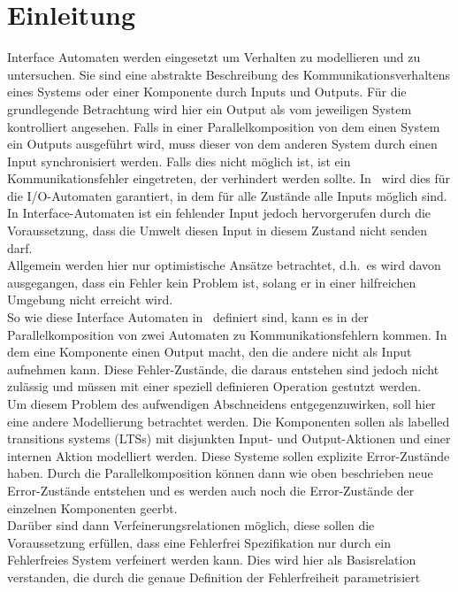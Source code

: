 \chapter{Einleitung}

Interface Automaten werden eingesetzt um Verhalten zu modellieren und zu
untersuchen. Sie sind eine abstrakte Beschreibung des Kommunikationsverhaltens
eines Systems oder einer Komponente durch Inputs und Outputs. Für die
grundlegende Betrachtung wird hier ein Output als vom jeweiligen System
kontrolliert angesehen. Falls in einer Parallelkomposition von dem einen System
ein Outputs ausgeführt wird, muss dieser von dem anderen System durch einen
Input synchronisiert werden. Falls dies nicht möglich ist, ist ein
Kommunikationsfehler eingetreten, der verhindert werden sollte.
In~\cite{Lynch1996} wird dies für die I/O-Automaten garantiert, in dem für alle
Zustände alle Inputs möglich sind. In Interface-Automaten ist ein fehlender
Input jedoch hervorgerufen durch die Voraussetzung, dass die Umwelt diesen
Input in diesem Zustand nicht senden darf.\\
Allgemein werden hier nur optimistische Ansätze betrachtet, d.h.\ es wird davon
ausgegangen, dass ein Fehler kein Problem ist, solang er in einer hilfreichen
Umgebung nicht erreicht wird.\\
So wie diese Interface Automaten in~\cite{Alfaro2004} definiert sind, kann es
in der Parallelkomposition von zwei Automaten zu Kommunikationsfehlern kommen.
In dem eine Komponente einen Output macht, den die andere nicht als Input
aufnehmen kann. Diese Fehler-Zustände, die daraus entstehen sind jedoch nicht
zulässig und müssen mit einer speziell definieren Operation gestutzt werden.\\
Um diesem Problem des aufwendigen Abschneidens entgegenzuwirken, soll hier eine
andere Modellierung betrachtet werden. Die Komponenten sollen als labelled
transitions systems (LTSs) mit disjunkten Input- und Output-Aktionen und einer
internen Aktion modelliert werden. Diese Systeme sollen explizite
Error-Zustände haben. Durch die Parallelkomposition können dann wie oben
beschrieben neue Error-Zustände entstehen und es werden auch noch die
Error-Zustände der einzelnen Komponenten geerbt.\\
Darüber sind dann Verfeinerungsrelationen möglich, diese sollen die
Voraussetzung erfüllen, dass eine Fehlerfrei Spezifikation nur durch ein
Fehlerfreies System verfeinert werden kann. Dies wird hier als Basisrelation
verstanden, die durch die genaue Definition der Fehlerfreiheit parametrisiert
